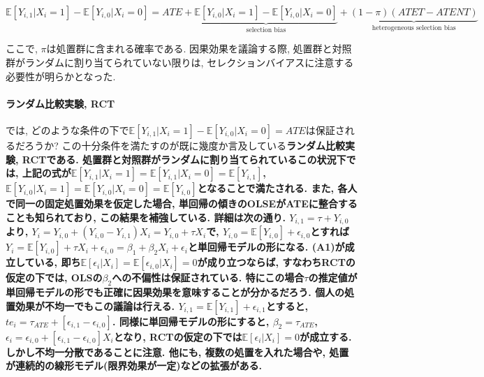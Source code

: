 \documentclass[paper=a4paper,fontsize=10pt]{jlreq}
\begin{document}
\begin{equation*}
  \mathbb{E}[Y_{i,1}|X_i=1]-\mathbb{E}[Y_{i,0}|X_i=0]=ATE+\underset{\text{selection bias}}{\underbrace{\mathbb{E}[Y_{i,0}|X_i=1]-\mathbb{E}[Y_{i,0}|X_i=0]}}+\underset{\text{heterogeneous selection bias}}{\underbrace{(1-\pi)(ATET-ATENT)}}
\end{equation*}


ここで, $\pi$は処置群に含まれる確率である. 因果効果を議論する際, 処置群と対照群がランダムに割り当てられていない限りは, セレクションバイアスに注意する必要性が明らかとなった. \\

\paragraph{ランダム比較実験, RCT}
では, どのような条件の下で$\mathbb{E}[Y_{i,1}|X_i=1]-\mathbb{E}[Y_{i,0}|X_i=0]=ATE$は保証されるだろうか? この十分条件を満たすのが既に幾度か言及している\rmfamily\mcfamily\bfseries{ランダム比較実験, RCT}\mdseries である. 処置群と対照群がランダムに割り当てられているこの状況下では, 上記の式が$\mathbb{E}[Y_{i,1}|X_i=1]=\mathbb{E}[Y_{i,1}|X_i=0]=\mathbb{E}[Y_{i,1}]$, $\mathbb{E}[Y_{i,0}|X_i=1]=\mathbb{E}[Y_{i,0}|X_i=0]=\mathbb{E}[Y_{i,0}]$となることで満たされる. また, 各人で同一の固定処置効果を仮定した場合, 単回帰の傾きのOLSEがATEに整合することも知られており, この結果を補強している. 詳細は次の通り. $Y_{i,1}=\tau + Y_{i,0}$より, $Y_i=Y_{i,0}+(Y_{i,0}-Y_{i,1})X_i=Y_{i,0}+\tau X_i$で, $Y_{i,0}=\mathbb{E}[Y_{i,0}]+\epsilon_{i,0}$とすれば$Y_i=\mathbb{E}[Y_{i,0}]+\tau X_i+\epsilon_{i,0}=\beta_1+\beta_2X_i+\epsilon_i$と単回帰モデルの形になる. (A1)が成立している, 即ち$\mathbb{E}[\epsilon_i|X_i]=\mathbb{E}[\epsilon_{i,0}|X_i]=0$が成り立つならば, すなわちRCTの仮定の下では, OLSの$\beta_2$への不偏性は保証されている. 特にこの場合$\tau$の推定値が単回帰モデルの形でも正確に因果効果を意味することが分かるだろう. 個人の処置効果が不均一でもこの議論は行える. $Y_{i,1}=\mathbb{E}[Y_{i,1}]+\epsilon_{i,1}$とすると, $te_i=\tau_{ATE}+[\epsilon_{i,1}-\epsilon_{i,0}]$. 同様に単回帰モデルの形にすると, $\beta_2=\tau_{ATE}$, $\epsilon_i=\epsilon_{i,0}+[\epsilon_{i,1}-\epsilon_{i,0}]X_i$となり, RCTの仮定の下では$\mathbb{E}[\epsilon_i|X_i]=0$が成立する. しかし不均一分散であることに注意. 他にも, 複数の処置を入れた場合や, 処置が連続的の線形モデル(限界効果が一定)などの拡張がある.\\
\end{document}
